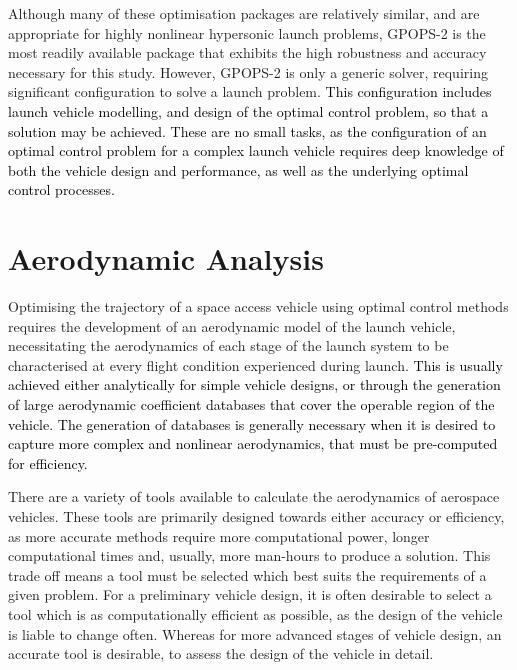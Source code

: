 Although many of these optimisation packages are relatively similar, and are appropriate for highly nonlinear hypersonic launch problems, GPOPS-2 is the most readily available package that exhibits the high robustness and accuracy necessary for this study. However, GPOPS-2 is only a generic solver, requiring significant configuration to solve a launch problem. \textcolor{black}{This configuration includes launch vehicle modelling, and design of the optimal control problem, so that a solution may be achieved. These are no small tasks, as the configuration of an optimal control problem for a complex launch vehicle requires deep knowledge of both the vehicle design and performance, as well as the underlying optimal control processes. } 














 







\section{Aerodynamic Analysis}

Optimising the trajectory of a space access vehicle using optimal control methods requires the development of an aerodynamic model of the launch vehicle, necessitating the aerodynamics of each stage of the launch system to be characterised at every flight condition experienced during launch. \textcolor{black}{This is usually achieved either analytically for simple vehicle designs, or through the generation of large aerodynamic coefficient databases that cover the operable region of the vehicle. The generation of databases is generally necessary when it is desired to capture more complex and nonlinear aerodynamics, that must be pre-computed for efficiency.}

There are a variety of tools available to calculate the aerodynamics of aerospace vehicles.
 These tools are primarily designed towards either accuracy or efficiency, as more accurate methods require more computational power, longer computational times and, usually, more man-hours to produce a solution. 
This trade off means a tool must be selected which best suits the requirements of a given problem. 
For a preliminary vehicle design, it is often desirable to select a tool which is as computationally efficient as possible, as the design of the vehicle is liable to change often. 
Whereas for more advanced stages of vehicle design, an accurate tool is desirable, to assess the design of the vehicle in detail. 

